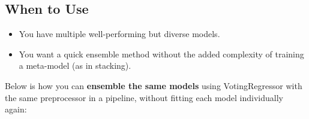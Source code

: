 \documentclass[
  letterpaper,
  DIV=11,
  numbers=noendperiod]{scrreprt}
\providecommand{\tightlist}{%
  \setlength{\itemsep}{0pt}\setlength{\parskip}{0pt}}\usepackage{longtable,booktabs,array}
\begin{document}
\subsection{When to Use}\label{when-to-use}

\begin{itemize}
\tightlist
\item
  You have multiple well-performing but diverse models.
\item
  You want a quick ensemble method without the added complexity of
  training a meta-model (as in stacking).
\end{itemize}

Below is how you can \textbf{ensemble the same models} using
VotingRegressor with the same preprocessor in a pipeline, without
fitting each model individually again:
\end{document}
